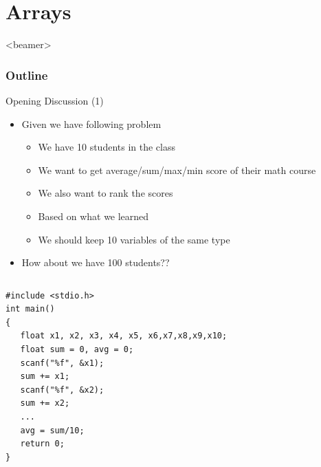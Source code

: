 \section{Arrays}
\label{sec:arry}
\begin{frame}<beamer>
    \frametitle{Outline}
    \tableofcontents[currentsection]
\end{frame}

\begin{frame}[fragile]{Opening Discussion (1)}

\begin{itemize}
	\item {Given we have following problem}
	\begin{itemize}
		\item {We have 10 students in the class}
		\item {We want to get average/sum/max/min score of their math course}
		\item {We also want to rank the scores}
		\item {Based on what we learned}
		\item {We should keep 10 variables of the same type}
	\end{itemize}
	\item {How about we have 100 students??}
\end{itemize}
\vspace{-0.15in}
\begin{columns}
\begin{column}{0.75\linewidth}
\begin{lstlisting}
#include <stdio.h>
int main()
{
   float x1, x2, x3, x4, x5, x6,x7,x8,x9,x10;
   float sum = 0, avg = 0;
   scanf("%f", &x1);
   sum += x1;
   scanf("%f", &x2);
   sum += x2;
   ...
   avg = sum/10;
   return 0;
}
\end{lstlisting}
\end{column}
\end{columns}
\end{frame}


